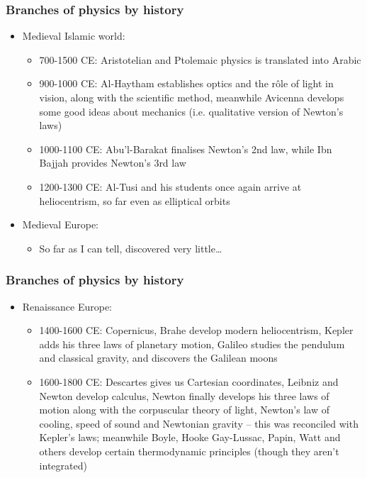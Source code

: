 \documentclass{beamer}
\begin{document}
\begin{frame}
\frametitle{Branches of physics by history}
\begin{itemize}
  \item<1-> Medieval Islamic world:
    \begin{itemize}
      \item<2-> 700-1500 CE: Aristotelian and Ptolemaic physics is translated into Arabic
      \item<3-> 900-1000 CE: Al-Haytham establishes optics and the r\^ole of light in vision, along with the scientific method, meanwhile Avicenna develops some good ideas about mechanics (i.e. qualitative version of Newton's laws)
      \item<4-> 1000-1100 CE: Abu'l-Barakat finalises Newton's 2nd law, while Ibn Bajjah provides Newton's 3rd law
      \item<5-> 1200-1300 CE: Al-Tusi and his students once again arrive at heliocentrism, so far even as elliptical orbits
    \end{itemize}
  \item<6-> Medieval Europe:
    \begin{itemize}
      \item<7-> So far as I can tell, discovered very little\ldots
    \end{itemize}
\end{itemize}
\end{frame}

\begin{frame}
\frametitle{Branches of physics by history}
\begin{itemize}
  \item<1-> Renaissance Europe:
    \begin{itemize}
      \item<2-> 1400-1600 CE: Copernicus, Brahe develop modern heliocentrism, Kepler adds his three laws of planetary motion, Galileo studies the pendulum and classical gravity, and discovers the Galilean moons
      \item<3-> 1600-1800 CE: Descartes gives us Cartesian coordinates, Leibniz and Newton develop calculus, Newton finally develops his three laws of motion along with the corpuscular theory of light, Newton's law of cooling, speed of sound and Newtonian gravity -- this was reconciled with Kepler's laws; meanwhile Boyle, Hooke Gay-Lussac, Papin, Watt and others develop certain thermodynamic principles (though they aren't integrated)
    \end{itemize}
\end{itemize}
\end{frame}
\end{document}
